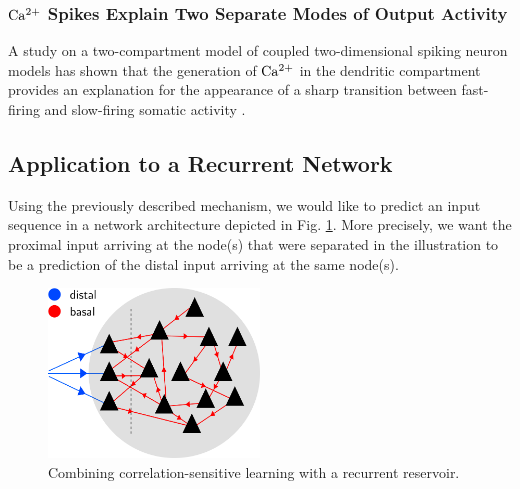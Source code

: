 \documentclass[10pt,a4paper]{article}
\begin{document}
\subsubsection{$\rm Ca^{2+}$ Spikes Explain Two Separate Modes of Output Activity}
A study on a two-compartment model of coupled two-dimensional spiking neuron models has shown that the generation of $\rm Ca^{2+}$ in the dendritic compartment provides an explanation for the appearance of a sharp transition between fast-firing and slow-firing somatic activity \cite{Yi_2017}.


\subsection{Application to a Recurrent Network}

Using the previously described mechanism, we would like to predict an input sequence in a network architecture depicted in Fig. \ref{fig:prox_dist_recurrent}. More precisely, we want the proximal input arriving at the node(s) that were separated in the illustration to be a prediction of the distal input arriving at the same node(s).
\begin{figure}
\centering
\includegraphics[width=0.5\textwidth]{./figures/prox_dist_rnn_illustration.png}
\caption{Combining correlation-sensitive learning with a recurrent reservoir.}
\label{fig:prox_dist_recurrent}
\end{figure}
\end{document}
